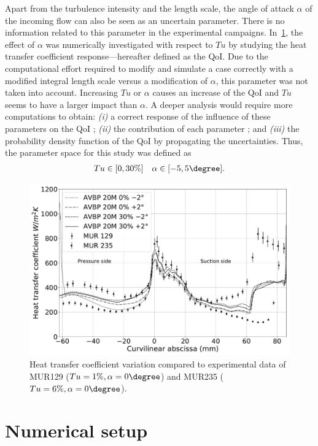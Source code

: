 Apart from the turbulence intensity and the length scale, the angle of attack $\alpha$ of the incoming flow can also be seen as an uncertain parameter. There is no information related to this parameter in the experimental campaigns. In~\cref{fig:space-tu-alpha}, the effect of $\alpha$ was numerically investigated with respect to $Tu$ by studying the heat transfer coefficient response---hereafter defined as the QoI. Due to the computational effort required to modify and simulate a case correctly with a modified integral length scale versus a modification of $\alpha$, this parameter was not taken into account. Increasing $Tu$ or $\alpha$ causes an increase of the QoI and $Tu$ seems to have a larger impact than $\alpha$. A deeper analysis would require more computations to obtain: \textit{(i)} a correct response of the influence of these parameters on the QoI ; \textit{(ii)} the contribution of each parameter ; and \textit{(iii)} the probability density function of the QoI by propagating the uncertainties. Thus, the parameter space for this study was defined as
\begin{align}
Tu \in [0, 30\%] \quad \alpha \in [-5,5\degree].
\end{align}

\begin{figure}[!h]
\centering
\includegraphics[width=0.9\linewidth,keepaspectratio]{fig/applications/ls89/11_2column_color-online-only_space_tu-alpha.pdf}
\caption{Heat transfer coefficient variation compared to experimental data of MUR129 ($Tu=1\%, \alpha = 0\degree$) and MUR235 ($Tu=6\%, \alpha = 0\degree$).}
\label{fig:space-tu-alpha}
\end{figure}

\section{Numerical setup}

